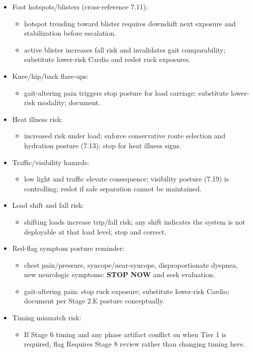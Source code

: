 \documentclass[10pt]{article}
\begin{document}
\begin{itemize}
\item Foot hotspots/blisters (cross-reference 7.11):
  \begin{itemize}
  \item hotspot trending toward blister requires downshift next exposure and stabilization before escalation.
  \item active blister increases fall risk and invalidates gait comparability; substitute lower-risk Cardio and reslot ruck exposures.
  \end{itemize}
\item Knee/hip/back flare-ups:
  \begin{itemize}
  \item gait-altering pain triggers stop posture for load carriage; substitute lower-risk modality; document.
  \end{itemize}
\item Heat illness risk:
  \begin{itemize}
  \item increased risk under load; enforce conservative route selection and hydration posture (7.13); stop for heat illness signs.
  \end{itemize}
\item Traffic/visibility hazards:
  \begin{itemize}
  \item low light and traffic elevate consequence; visibility posture (7.19) is controlling; reslot if safe separation cannot be maintained.
  \end{itemize}
\item Load shift and fall risk:
  \begin{itemize}
  \item shifting loads increase trip/fall risk; any shift indicates the system is not deployable at that load level; stop and correct.
  \end{itemize}
\item Red-flag symptom posture reminder:
  \begin{itemize}
  \item chest pain/pressure, syncope/near-syncope, disproportionate dyspnea, new neurologic symptoms: \textbf{STOP} \textbf{NOW} and seek evaluation.
  \item gait-altering pain: stop ruck exposure; substitute lower-risk Cardio; document per Stage 2.E posture conceptually.
  \end{itemize}
\item Timing mismatch risk:
  \begin{itemize}
  \item If Stage 6 timing and any phase artifact conflict on when Tier 1 is required, flag Requires Stage 8 review rather than changing timing here.
  \end{itemize}
\end{itemize}
\end{document}
